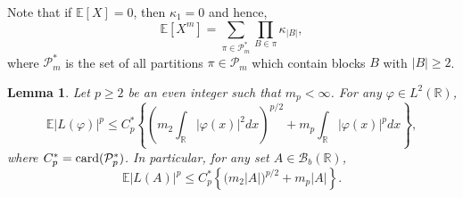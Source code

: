 \documentclass[12pt]{article}
\newtheorem{lemma}[theorem]{Lemma}
\def\cB{\mathcal{B}}
\def\cC{\mathcal{C}}
\def\cP{\mathcal{P}}
\def\bE{\mathbb{E}}
\def\bR{\mathbb{R}}
\def\k{\kappa}
\begin{document}
Note that if $\bE[X]=0$, then $\k_1=0$ and hence,
\begin{equation}
\label{cum}
\bE[X^m]=\sum_{\pi \in \cP_m^*} \prod_{B \in \pi} \k_{|B|},
\end{equation}
where $\cP_m^*$ is the set of all partitions $\pi \in \cP_m$ which contain blocks $B$ with $|B|\geq 2$.

\medskip




\begin{lemma}
\label{lem-p-mom-L}
Let $p\geq 2$ be an even integer such that $m_p<\infty$. For any $\varphi \in L^2(\bR)$,
\begin{equation}
\label{p-mom-L}
\bE|L(\varphi)|^p \leq C_p^* \left\{ \left(m_2\int_{\bR}|\varphi(x)|^2 dx\right)^{p/2} + m_p \int_{\bR}|\varphi(x)|^p dx\right\},
\end{equation}
where  $C_p^*={\rm card}(\cP_p^*)$.
In particular, for any set $A \in \cB_b(\bR)$,
\begin{equation}
\label{p-mom-L}
\bE|L(A)|^p \leq C_p^* \left\{ \big(m_2|A|\big)^{p/2} + m_p |A| \right\}.
\end{equation}
\end{lemma}
\end{document}
